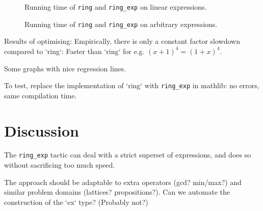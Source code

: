 \documentclass{llncs}
\newcommand{\lean}[1]{\texttt{#1}\xspace} %
\newcommand{\ring}{\lean{ring}}
\newcommand{\ringexp}{\lean{ring\_exp}}
\begin{document}
\begin{figure}

\caption{Running time of \ring and \ringexp on linear expressions.}
\end{figure}
\begin{figure}

\caption{Running time of \ring and \ringexp on arbitrary expressions.}
\end{figure}


Results of optimising:
Empirically, there is only a constant factor slowdown compared to `ring`:
Faster than `ring` for e.g. $(x + 1)^4 = (1 + x)^4$.

Some graphs with nice regression lines.

To test, replace the implementation of `ring` with \ringexp in mathlib: no errors, same compilation time.

\section{Discussion}

The \ringexp tactic can deal with a strict superset of expressions,
and does so without sacrificing too much speed.

The approach should be adaptable to extra operators (gcd? min/max?) and similar problem domains (lattices? propositions?).
Can we automate the construction of the `ex` type? (Probably not?)

\printbibliography
\end{document}
